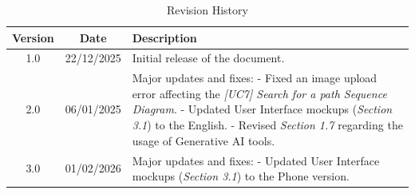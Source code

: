 \begin{table}[H]
    \centering
    \begin{tabular}{|c|c|p{10cm}|}
        \hline
        \textbf{Version} & \textbf{Date} & \textbf{Description} \\
        \hline
        1.0 & 22/12/2025 & Initial release of the document. \\
        \hline
        2.0 & 06/01/2025 & Major updates and fixes: \newline
        - Fixed an image upload error affecting the \textit{[UC7] Search for a path Sequence Diagram}. \newline
        - Updated User Interface mockups (\textit{Section 3.1}) to the English. \newline
        - Revised \textit{Section 1.7} regarding the usage of Generative AI tools. \\
        \hline
        3.0 & 01/02/2026 & Major updates and fixes: \newline
        - Updated User Interface mockups (\textit{Section 3.1}) to the Phone version. \\
        \hline
    \end{tabular}
    \caption{Revision History}
    \label{tab:revision_history}
\end{table}